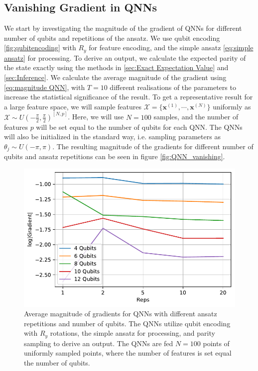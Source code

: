 \subsection{Vanishing Gradient in QNNs}\label{sec:Vanishing Gradient for QNNs}
We start by investigating the magnitude of the gradient of QNNs for different number of qubits and repetitions of the ansatz. We use qubit encoding \autoref{fig:qubitencoding} with $R_y$ for feature encoding, and the simple ansatz \autoref{eq:simple ansatz} for processing. To derive an output, we calculate the expected parity of the state exactly using the methods in \autoref{sec:Exact Expectation Value} and \autoref{sec:Inference}. We calculate the average magnitude of the gradient using \autoref{eq:magnitude QNN}, with $T=10$ different realisations of the parameters to increase the statistical significance of the result. To get a representative result for a large feature space, we will sample features $\mathcal{X} = \{\boldsymbol{x}^{(1)}, \cdots, \boldsymbol{x}^{(N)}\}$ uniformly as $\mathcal{X} \sim U(-\frac{\pi}{2}, \frac{\pi}{2})^{[N,p]}$. Here, we will use $N=100$ samples, and the number of features $p$ will be set equal to the number of qubits for each QNN. The QNNs will also be initialized in the standard way, i.e. sampling parameters as $\theta_j \sim U(-\pi, \pi)$. The resulting magnitude of the gradients for different number of qubits and ansatz repetitions can be seen in figure \autoref{fig:QNN_vanishing}.

\begin{figure}[H]
    \centering
    \includegraphics[width=12cm]{latex/figures/vanishing_gradient_QNN.pdf}
    \caption{Average magnitude of gradients for QNNs with different ansatz repetitions and number of qubits. The QNNs utilize qubit encoding with $R_y$ rotations, the simple ansatz for processing, and parity sampling to derive an output. The QNNs are fed $N=100$ points of uniformly sampled points, where the number of features is set equal the number of qubits. }
    \label{fig:QNN_vanishing}
\end{figure}

